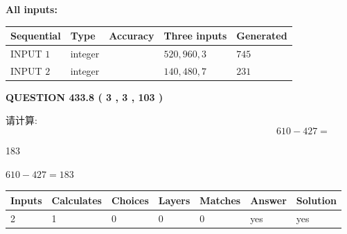 \documentclass{ctexart}
\begin{document}
   
   
   
\noindent\vspace{0.1in}\hspace{-0.08in} {\textbf{\Large{All inputs: }}}
   
   
  
  
\noindent\begin{tabular}{|l|l|l|l|l|}
\hline
 Sequential & Type & Accuracy & Three inputs & Generated \\ 
\hline
 
 
  INPUT $  1 $ & integer &  & $
 520
 , 
 960
 , 
 3
 $ & $ 745 $ 
 \\  \hline  
 
 
  INPUT $  2 $ & integer &  & $
 140
 , 
 480
 , 
 7
 $ & $ 231 $ 
 \\  \hline  
 \end{tabular}
   
   
  
\vspace{0.2in}
  
{\textbf{\Large{QUESTION
433.8 
 ( 3 , 3 , 103 )
}}}
  
  
 
请计算:
\begin{equation}
610 -   %
427 = \nonumber
\end{equation}
 
 
 
\noindent{}
 
 

183
 
 
\noindent{}
 
 

 
 
 
\noindent{}
 
 

$ %
610 -  %
427=   %
183$
 
 
\noindent{}
 
 

 
   
   
   
   
\noindent\begin{tabular}{|l|l|l|l|l|l|l|}
 \hline
Inputs & Calculates & Choices & Layers & Matches & Answer & Solution \\ \hline
 2  & 
 1  & 
 0
  & 
 0  & 
 0  & 
  yes & 
  yes 
  \\ \hline
 \end{tabular}
   
\end{document}
